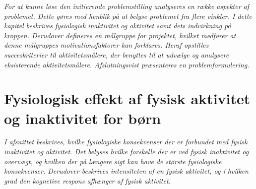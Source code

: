 \textit{For at kunne løse den initierende problemstilling analyseres en række aspekter af problemet. Dette gøres med henblik på at belyse problemet fra flere vinkler. I dette kapitel beskrives fysiologisk inaktivitet og aktivitet samt dets indvirkning på kroppen. Derudover defineres en målgruppe for projektet, hvilket medfører at denne målgruppes motivationsfaktorer kan forklares. Heraf opstilles succeskriterier til aktivitetsmålere, der benyttes til at udvælge og analysere eksisterende aktivitetsmålere. Afslutningsvist præsenteres en problemformulering.}

\section{Fysiologisk effekt af fysisk aktivitet og inaktivitet for børn}\label{sec:fysio}
\textit{I afsnittet beskrives, hvilke fysiologiske konsekvenser der er forbundet med fysisk inaktivitet og aktivitet. Det belyses hvilke forskelle der er ved fysisk inaktivitet og overvægt, og hvilken der på længere sigt kan have de største fysiologiske konsekvenser. Derudover beskrives intensiteten af en fysisk aktivitet, og i hvilken grad den kognetive respons afhænger af fysisk aktivitet.}

